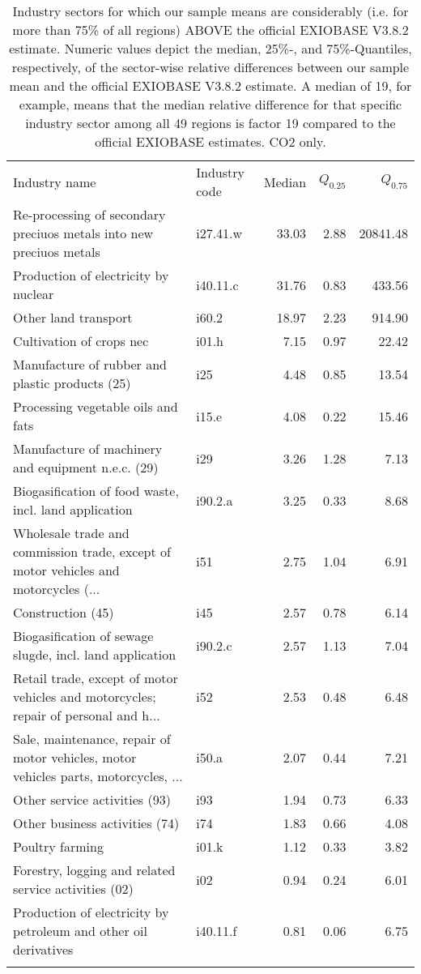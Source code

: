 \begin{table}

\caption{Industry sectors for which our sample means are 
                  considerably (i.e. for more than 75\% of all regions) ABOVE 
                  the official EXIOBASE V3.8.2 estimate. Numeric values depict 
                  the median, 25\%-, and 75\%-Quantiles, respectively, 
                  of the sector-wise relative differences between our sample mean 
                  and the official EXIOBASE V3.8.2 estimate. A median of 19, 
                  for example, means that the median relative difference for 
                  that specific industry sector among all 49 regions is factor 
                  19 compared to the official EXIOBASE estimates. CO2 only.}
\centering
\begin{tabular}[t]{llrrr}
\tophline
Industry name & Industry code & Median & $Q_{0.25}$ & $Q_{0.75}$\\
\middlehline
Re-processing of secondary preciuos metals into new preciuos metals & i27.41.w & 33.03 & 2.88 & 20841.48\\
Production of electricity by nuclear & i40.11.c & 31.76 & 0.83 & 433.56\\
Other land transport & i60.2 & 18.97 & 2.23 & 914.90\\
Cultivation of crops nec & i01.h & 7.15 & 0.97 & 22.42\\
Manufacture of rubber and plastic products (25) & i25 & 4.48 & 0.85 & 13.54\\
Processing vegetable oils and fats & i15.e & 4.08 & 0.22 & 15.46\\
Manufacture of machinery and equipment n.e.c. (29) & i29 & 3.26 & 1.28 & 7.13\\
Biogasification of food waste, incl. land application & i90.2.a & 3.25 & 0.33 & 8.68\\
Wholesale trade and commission trade, except of motor vehicles and motorcycles (... & i51 & 2.75 & 1.04 & 6.91\\
Construction (45) & i45 & 2.57 & 0.78 & 6.14\\
Biogasification of sewage slugde, incl. land application & i90.2.c & 2.57 & 1.13 & 7.04\\
Retail trade, except of motor vehicles and motorcycles; repair of personal and h... & i52 & 2.53 & 0.48 & 6.48\\
Sale, maintenance, repair of motor vehicles, motor vehicles parts, motorcycles, ... & i50.a & 2.07 & 0.44 & 7.21\\
Other service activities (93) & i93 & 1.94 & 0.73 & 6.33\\
Other business activities (74) & i74 & 1.83 & 0.66 & 4.08\\
Poultry farming & i01.k & 1.12 & 0.33 & 3.82\\
Forestry, logging and related service activities (02) & i02 & 0.94 & 0.24 & 6.01\\
Production of electricity by petroleum and other oil derivatives & i40.11.f & 0.81 & 0.06 & 6.75\\
\bottomhline
\end{tabular}
\end{table}
